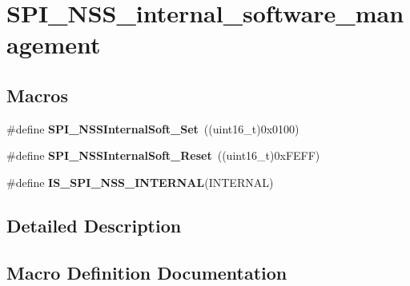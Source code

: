\hypertarget{group___s_p_i___n_s_s__internal__software__management}{}\section{S\+P\+I\+\_\+\+N\+S\+S\+\_\+internal\+\_\+software\+\_\+management}
\label{group___s_p_i___n_s_s__internal__software__management}
\subsection*{Macros}
\begin{DoxyCompactItemize}
\item 
\hypertarget{group___s_p_i___n_s_s__internal__software__management_ga6b2102816167d12140648dba49a192a7}{}\#define {\bfseries S\+P\+I\+\_\+\+N\+S\+S\+Internal\+Soft\+\_\+\+Set}~((uint16\+\_\+t)0x0100)\label{group___s_p_i___n_s_s__internal__software__management_ga6b2102816167d12140648dba49a192a7}

\item 
\hypertarget{group___s_p_i___n_s_s__internal__software__management_ga292ec7bc0cd362d61b3b5eed620522c2}{}\#define {\bfseries S\+P\+I\+\_\+\+N\+S\+S\+Internal\+Soft\+\_\+\+Reset}~((uint16\+\_\+t)0x\+F\+E\+F\+F)\label{group___s_p_i___n_s_s__internal__software__management_ga292ec7bc0cd362d61b3b5eed620522c2}

\item 
\#define {\bfseries I\+S\+\_\+\+S\+P\+I\+\_\+\+N\+S\+S\+\_\+\+I\+N\+T\+E\+R\+N\+A\+L}(I\+N\+T\+E\+R\+N\+A\+L)
\end{DoxyCompactItemize}


\subsection{Detailed Description}


\subsection{Macro Definition Documentation}
\hypertarget{group___s_p_i___n_s_s__internal__software__management_ga7036de442206fb8b365528c115345b36}{}
